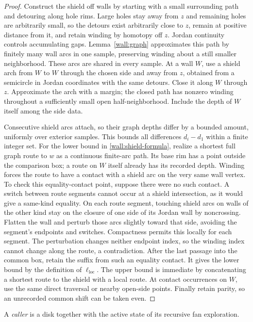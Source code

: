 \begin{proof}
Construct the shield off walls by starting with a small surrounding path and detouring along hole rims.  Large holes stay away from $z$ and remaining holes are arbitrarily small, so the detours exist arbitrarily close to $z$, remain at positive distance from it, and retain winding by homotopy off $z$.  Jordan continuity controls accumulating gaps.  Lemma~\ref{wall:graph} approximates this path by finitely many wall arcs in one sample, preserving winding about a still smaller neighborhood.  These arcs are shared in every sample.  At a wall $W$, use a shield arch from $W$ to $W$ through the chosen side and away from $z$, obtained from a semicircle in Jordan coordinates with the same detours.  Close it along $W$ through $z$.  Approximate the arch with a margin; the closed path has nonzero winding throughout a sufficiently small open half-neighborhood.  Include the depth of $W$ itself among the side data.

Consecutive shield arcs attach, so their graph depths differ by a bounded amount, uniformly over exterior samples.  This bounds all differences $d_i-d_1$ within a finite integer set.  For the lower bound in \eqref{wall:shield-formula}, realize a shortest full graph route to $w$ as a continuous finite-arc path.  Its base rim has a point outside the comparison box; a route on $W$ itself already has its recorded depth.  Winding forces the route to have a contact with a shield arc on the very same wall vertex.  To check this equality-contact point, suppose there were no such contact.  A switch between route segments cannot occur at a shield intersection, as it would give a same-kind equality.  On each route segment, touching shield arcs on walls of the other kind stay on the closure of one side of its Jordan wall by noncrossing.  Flatten the wall and perturb those arcs slightly toward that side, avoiding the segment's endpoints and switches.  Compactness permits this locally for each segment.  The perturbation changes neither endpoint index, so the winding index cannot change along the route, a contradiction.  After the last passage into the common box, retain the suffix from such an equality contact.  It gives the lower bound by the definition of $\ell_{\mathrm{loc}}$.  The upper bound is immediate by concatenating a shortest route to the shield with a local route.  At contact occurrences on $W$, use the same direct traversal or nearby open-side points.  Finally retain parity, so an unrecorded common shift can be taken even.
\end{proof}

A \emph{caller} is a disk together with the active state of its recursive fan exploration.

